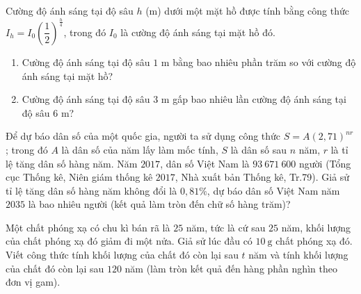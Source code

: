 \begin{vd}%
	Cường độ ánh sáng tại độ sâu $h$ (m) dưới một mặt hồ được tính bằng công thức $I_h=I_0\left(\dfrac{1}{2}\right)^{\tfrac{h}{4}}$, trong đó $I_0$ là cường độ ánh sáng tại mặt hồ đó.
	\begin{enumerate}
		\item Cường độ ánh sáng tại độ sâu $1$ m bằng bao nhiêu phần trăm so với cường độ ánh sáng tại mặt hồ?
		\item Cường độ ánh sáng tại độ sâu $3$ m gấp bao nhiêu lần cường độ ánh sáng tại độ sâu $6$ m?
	\end{enumerate}
\end{vd} 

\begin{vd}
	Để dự báo dân số của một quốc gia, người ta sử dụng công thức $S=A(2,71)^{nr}$; trong đó $A$ là dân số của năm lấy làm mốc tính, $S$ là dân số sau $n$ năm, $r$ là tỉ lệ tăng dân số hàng năm. Năm $2017$, dân số Việt Nam là $93~671~600$ người (Tổng cục Thống kê, Niên giám thống kê $2017$, Nhà xuất bản Thống kê, Tr.79). Giả sử tỉ lệ tăng dân số hàng năm không đổi là $0{,}81\%$, dự báo dân số Việt Nam năm $2035$ là bao nhiêu người (kết quả làm tròn đến chữ số hàng trăm)?
\end{vd} 

\begin{vd}%
	Một chất phóng xạ có chu kì bán rã là $25$ năm, tức là cứ sau $25$ năm, khối lượng của chất phóng xạ đó giảm đi một nửa. Giả sử lúc đầu có $10 \mathrm{~g}$ chất phóng xạ đó. Viết công thức tính khối lượng của chất đó còn lại sau $t$ năm và tính khối lượng của chất đó còn lại sau $120$ năm (làm tròn kết quả đến hàng phần nghìn theo đơn vị gam).
\end{vd} 


